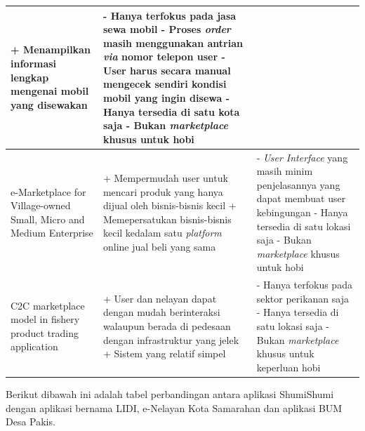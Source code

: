\documentclass[a4paper]{article}
\begin{document}
\begin{itemize}
\begin{centering}
\begin{longtable}{|p{3cm}|p{5cm}|p{5cm}|}
        + Menampilkan informasi lengkap mengenai mobil yang disewakan \newline
                & - Hanya terfokus pada jasa sewa mobil \newline
        - Proses \textit{order} masih menggunakan antrian \textit{via} nomor telepon user \newline
        - User harus secara manual mengecek sendiri kondisi mobil yang ingin disewa \newline
        - Hanya tersedia di satu kota saja \newline
        - Bukan \textit{marketplace} khusus untuk hobi                                                                                               \\
        \hline
        e-Marketplace for Village-owned Small, Micro and Medium Enterprise
                & + Mempermudah user untuk mencari produk yang hanya dijual oleh bisnis-bisnis kecil \newline
        + Memepersatukan bisnis-bisnis kecil kedalam satu \textit{platform} online jual beli yang sama \newline
                & - \textit{User Interface} yang masih minim penjelasannya yang dapat membuat user kebingungan \newline
        - Hanya tersedia di satu lokasi saja \newline
        - Bukan \textit{marketplace} khusus untuk hobi                                                                                               \\
        \hline
        C2C marketplace model in fishery product trading application
                & + User dan nelayan dapat dengan mudah berinteraksi walaupun berada di pedesaan dengan infrastruktur yang jelek \newline
        + Sistem yang relatif simpel \newline
                & - Hanya terfokus pada sektor perikanan saja \newline
        - Hanya tersedia di satu lokasi saja \newline
        - Bukan \textit{marketplace} khusus untuk keperluan hobi                                                                                     \\
        \hline
    \end{longtable}
    \end{centering}

    \newpage
    Berikut dibawah ini adalah tabel perbandingan antara aplikasi ShumiShumi dengan aplikasi bernama LIDI\autocite{lidi-car-rental}, e-Nelayan Kota Samarahan\autocite[1-10]{fishes-marketplace} dan aplikasi BUM Desa Pakis\autocite{bum-mekarsari}.


\end{itemize}
\end{document}
